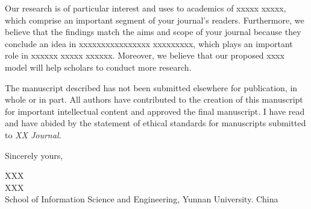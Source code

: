 \documentclass{article}
\begin{document}
Our research is of particular interest and uses to academics of xxxxx xxxxx, which comprise an important segment of your journal's readers. Furthermore, we believe that the findings match the aims and scope of your journal because they conclude an idea in xxxxxxxxxxxxxxxx xxxxxxxxx, which plays an important role in xxxxxx xxxxx xxxxxx. Moreover, we believe that our proposed xxxx model will help scholars to conduct more research.

The manuscript described has not been submitted elsewhere for publication, in whole or in part. All authors have contributed to the creation of this manuscript for important intellectual content and approved the final manuscript. I have read and have abided by the statement of ethical standards for manuscripts submitted to \textit{XX Journal}.

\bigskip %

Sincerely yours,

\vspace{20pt} %

XXX \\
XXX\\
School of Information Science and Engineering, Yunnan University. China
\end{document}
